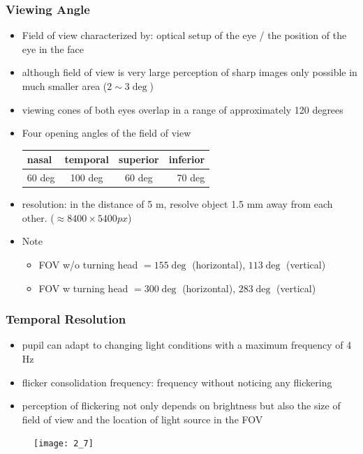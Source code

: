 \documentclass{standalone}
\begin{document}
\subsubsection{Viewing Angle}
\begin{itemize}
	\item Field of view characterized by: optical setup of the eye / the position of the eye in the face
	\item although field of view is very large perception of sharp images only possible in much smaller area ($2 \sim 3\deg$)
	\item viewing cones of both eyes overlap in a range of approximately 120 degrees
	\item Four opening angles of the field of view
\begin{table}[H]
\centering
\begin{tabular}{|l|c|c|r|}
\hline
 nasal & temporal & superior & inferior \\ \hline
60 deg & 100 deg & 60 deg & 70 deg \\ \hline
\end{tabular}
\end{table}
	\item resolution: in the distance of 5 m, resolve object 1.5 mm away from each other. ($\approx 8400 \times 5400 px$)
	\item Note 
		\begin{itemize} 
			\item FOV w/o turning head $= 155\deg$ (horizontal), $113\deg$ (vertical) 
			\item FOV w turning head $= 300\deg$ (horizontal), $283\deg$ (vertical) 
		\end{itemize}
\end{itemize}
\subsubsection{Temporal Resolution}
\begin{itemize}
	\item pupil can adapt to changing light conditions with a maximum frequency of 4 Hz	
	\item flicker consolidation frequency: frequency without noticing any flickering
	\item perception of flickering not only depends on brightness but also the size of field of view and the location of light source in the FOV
\end{itemize}

\begin{figure}[H]
	\texttt{[image: 2\_7]}
\end{figure}
\end{document}
